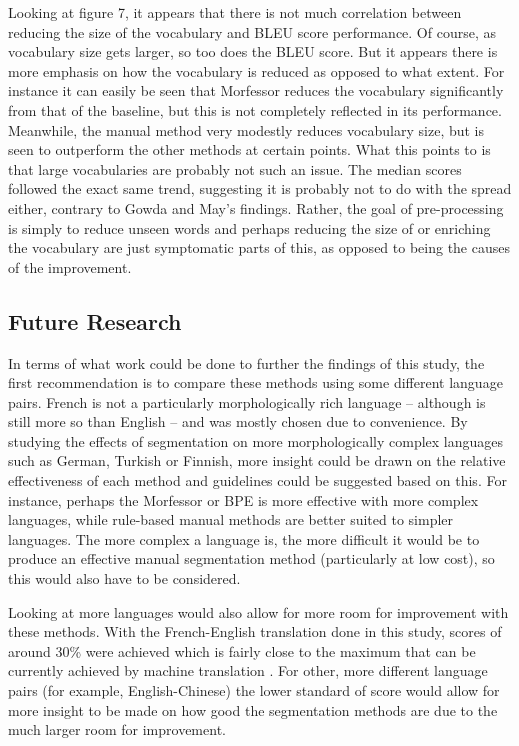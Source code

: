 \documentclass[11pt]{article}
\begin{document}
Looking at figure 7, it appears that there is not much correlation between reducing the size of the vocabulary and BLEU score performance. Of course, as vocabulary size gets larger, so too does the BLEU score. But it appears there is more emphasis on how the vocabulary is reduced as opposed to what extent. For instance it can easily be seen that Morfessor reduces the vocabulary significantly from that of the baseline, but this is not completely reflected in its performance. Meanwhile, the manual method very modestly reduces vocabulary size, but is seen to outperform the other methods at certain points. What this points to is that large vocabularies are probably not such an issue. The median scores followed the exact same trend, suggesting it is probably not to do with the spread either, contrary to Gowda and May's \citeyearpar{gowda-may-2020-finding} findings. Rather, the goal of pre-processing is simply to reduce unseen words and perhaps reducing the size of or enriching the vocabulary are just symptomatic parts of this, as opposed to being the causes of the improvement.

\subsection{Future Research}

In terms of what work could be done to further the findings of this study, the first recommendation is to compare these methods using some different language pairs. French is not a particularly morphologically rich language -- although is still more so than English -- and was mostly chosen due to convenience. By studying the effects of segmentation on more morphologically complex languages such as German, Turkish or Finnish, more insight could be drawn on the relative effectiveness of each method and guidelines could be suggested based on this. For instance, perhaps the Morfessor or BPE is more effective with more complex languages, while rule-based manual methods are better suited to simpler languages. The more complex a language is, the more difficult it would be to produce an effective manual segmentation method (particularly at low cost), so this would also have to be considered.

\bigskip

Looking at more languages would also allow for more room for improvement with these methods. With the French-English translation done in this study, scores of around 30\% were achieved which is fairly close to the maximum that can be currently achieved by machine translation \citep{jean2015using}. For other, more different language pairs (for example, English-Chinese) the lower standard of score would allow for more insight to be made on how good the segmentation methods are due to the much larger room for improvement.
\end{document}
